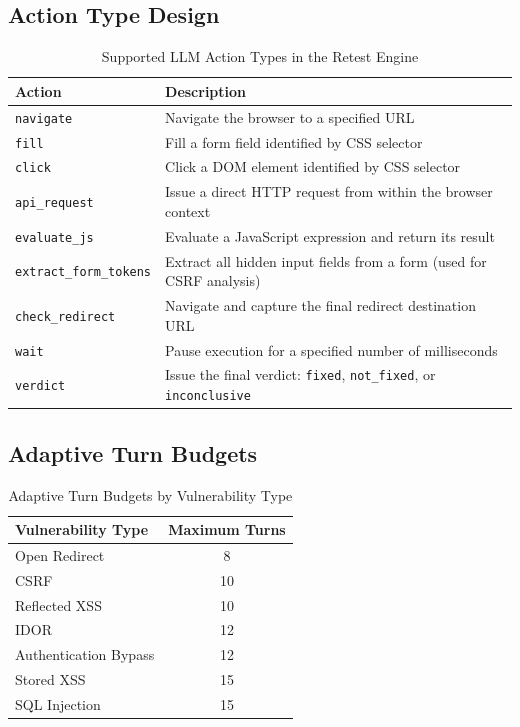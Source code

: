 \subsection{Action Type Design}

\begin{table}[h!]
\centering
\caption{Supported LLM Action Types in the Retest Engine}
\label{tab:actions}
\begin{tabular}{|l|p{9cm}|}
\hline
\textbf{Action} & \textbf{Description} \\
\hline
\texttt{navigate} & Navigate the browser to a specified URL \\
\texttt{fill} & Fill a form field identified by CSS selector \\
\texttt{click} & Click a DOM element identified by CSS selector \\
\texttt{api\_request} & Issue a direct HTTP request from within the browser context \\
\texttt{evaluate\_js} & Evaluate a JavaScript expression and return its result \\
\texttt{extract\_form\_tokens} & Extract all hidden input fields from a form (used for CSRF analysis) \\
\texttt{check\_redirect} & Navigate and capture the final redirect destination URL \\
\texttt{wait} & Pause execution for a specified number of milliseconds \\
\texttt{verdict} & Issue the final verdict: \texttt{fixed}, \texttt{not\_fixed}, or \texttt{inconclusive} \\
\hline
\end{tabular}
\end{table}

\subsection{Adaptive Turn Budgets}

\begin{table}[h!]
\centering
\caption{Adaptive Turn Budgets by Vulnerability Type}
\label{tab:turn_budgets}
\begin{tabular}{|l|c|}
\hline
\textbf{Vulnerability Type} & \textbf{Maximum Turns} \\
\hline
Open Redirect & 8 \\
CSRF & 10 \\
Reflected XSS & 10 \\
IDOR & 12 \\
Authentication Bypass & 12 \\
Stored XSS & 15 \\
SQL Injection & 15 \\
\hline
\end{tabular}
\end{table}

